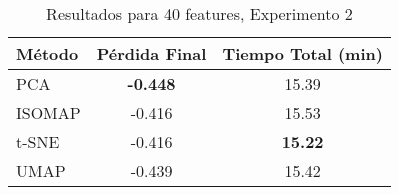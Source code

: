
\begin{table}[h]
\centering
\begin{tabular}{lcc}
\toprule
\textbf{Método} & \textbf{Pérdida Final} & \textbf{Tiempo Total (min)} \\
\midrule
PCA & \textbf{-0.448} & 15.39 \\
ISOMAP & -0.416 & 15.53 \\
t-SNE & -0.416 & \textbf{15.22} \\
UMAP & -0.439 & 15.42 \\
\bottomrule
\end{tabular}
\caption{Resultados para 40 features, Experimento 2}
\label{tab:results_40feat_exp2}
\end{table}

